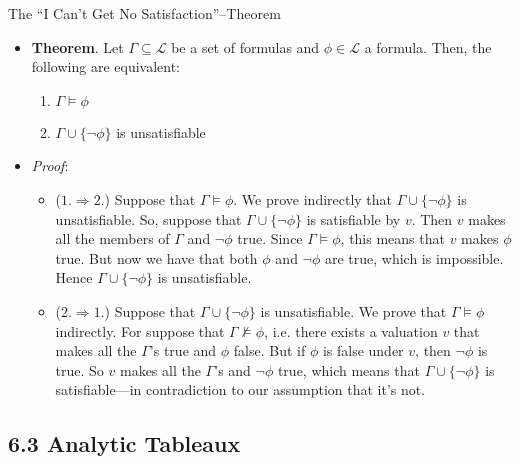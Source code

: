 \begin{frame}{The ``I Can't Get No Satisfaction''--Theorem}

	\begin{itemize}
		
		\item \textbf{Theorem}. Let $\Gamma\subseteq\mathcal{L}$ be a set of formulas and $\phi\in\mathcal{L}$ a formula. Then, the following are equivalent:
			\begin{enumerate}[1.]
			
				\item $\Gamma\vDash\phi$
				
				\item $\Gamma\cup\{\neg\phi\}$ is unsatisfiable
			
			\end{enumerate}
			
		\item \emph{Proof}:
		
			\begin{itemize}
			
				\item ($1.\Rightarrow 2.$) Suppose that $\Gamma\vDash\phi$. We prove indirectly that $\Gamma\cup\{\neg\phi\}$ is unsatisfiable. So, suppose that  $\Gamma\cup\{\neg\phi\}$  is satisfiable by $v$. Then $v$ makes all the members of $\Gamma$ and $\neg\phi$ true. Since $\Gamma\vDash\phi$, this means that $v$ makes $\phi$ true. But now we have that both $\phi$ and $\neg\phi$ are true, which is impossible. Hence $\Gamma\cup\{\neg\phi\}$ is unsatisfiable.
				
				\item ($2.\Rightarrow 1.$) Suppose that $\Gamma\cup\{\neg\phi\}$ is unsatisfiable. We prove that $\Gamma\vDash\phi$ indirectly. For suppose that $\Gamma\nvDash\phi$, i.e. there exists a valuation $v$ that makes all the $\Gamma$'s true and $\phi$ false. But if $\phi$ is false under $v$, then $\neg\phi$ is true. So $v$ makes all the $\Gamma$'s and $\neg\phi$ true, which means that $\Gamma\cup\{\neg\phi\}$ is satisfiable---in contradiction to our assumption that it's not.
			
			\end{itemize}

	\end{itemize}

\end{frame}

\subsection{6.3 Analytic Tableaux}

